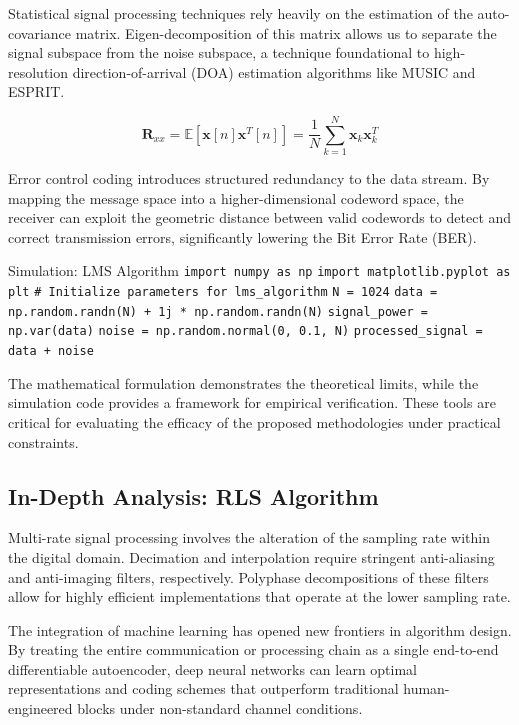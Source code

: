 Statistical signal processing techniques rely heavily on the estimation of the auto-covariance matrix. Eigen-decomposition of this matrix allows us to separate the signal subspace from the noise subspace, a technique foundational to high-resolution direction-of-arrival (DOA) estimation algorithms like MUSIC and ESPRIT.

\begin{equation}
    \mathbf{R}_{xx} = \mathbb{E}[\mathbf{x}[n]\mathbf{x}^T[n]] = \frac{1}{N} \sum_{k=1}^{N} \mathbf{x}_k \mathbf{x}_k^T
\end{equation}

Error control coding introduces structured redundancy to the data stream. By mapping the message space into a higher-dimensional codeword space, the receiver can exploit the geometric distance between valid codewords to detect and correct transmission errors, significantly lowering the Bit Error Rate (BER).

\begin{pythonbox}{Simulation: LMS Algorithm}
\texttt{import numpy as np}
\texttt{import matplotlib.pyplot as plt}
\texttt{}
\texttt{\# Initialize parameters for lms\_algorithm}
\texttt{N = 1024}
\texttt{data = np.random.randn(N) + 1j * np.random.randn(N)}
\texttt{signal\_power = np.var(data)}
\texttt{noise = np.random.normal(0, 0.1, N)}
\texttt{processed\_signal = data + noise}
\end{pythonbox}

\vspace{0.5cm}
The mathematical formulation demonstrates the theoretical limits, while the simulation code provides a framework for empirical verification. These tools are critical for evaluating the efficacy of the proposed methodologies under practical constraints.


\subsection{In-Depth Analysis: RLS Algorithm}
Multi-rate signal processing involves the alteration of the sampling rate within the digital domain. Decimation and interpolation require stringent anti-aliasing and anti-imaging filters, respectively. Polyphase decompositions of these filters allow for highly efficient implementations that operate at the lower sampling rate.

The integration of machine learning has opened new frontiers in algorithm design. By treating the entire communication or processing chain as a single end-to-end differentiable autoencoder, deep neural networks can learn optimal representations and coding schemes that outperform traditional human-engineered blocks under non-standard channel conditions.

